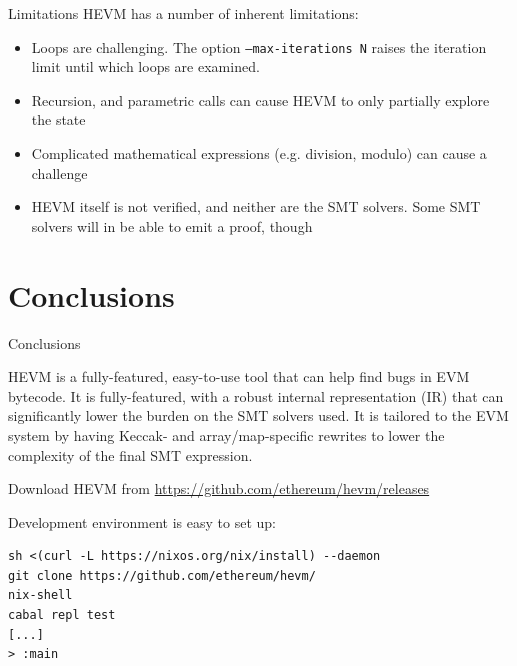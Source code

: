 \documentclass[aspectratio=169]{beamer}
\begin{document}
\begin{frame}[fragile=singleslide]{Limitations}
HEVM has a number of inherent limitations:

\begin{itemize}
\item Loops are challenging. The option \texttt{--max-iterations N} raises the iteration limit until which loops are examined.
\item Recursion, and parametric calls can cause HEVM to only partially explore the state
\item Complicated mathematical expressions (e.g. division, modulo) can cause a challenge
\item HEVM itself is not verified, and neither are the SMT solvers. Some SMT solvers will in be able to emit a proof, though
\end{itemize}
\end{frame}

\section{Conclusions}
\begin{frame}[fragile=singleslide]{Conclusions}

HEVM is a fully-featured, easy-to-use tool that can help find bugs in EVM bytecode. It is fully-featured, with a robust internal representation (IR) that can significantly lower the burden on the SMT solvers used. It is tailored to the EVM system by having Keccak- and array/map-specific rewrites to lower the complexity of the final SMT expression.
\bigskip

Download HEVM from \url{https://github.com/ethereum/hevm/releases}
\bigskip

Development environment is easy to set up:
\begin{Verbatim}[frame=single, framerule=0.2mm, framesep=2mm,fontsize=\footnotesize]
sh <(curl -L https://nixos.org/nix/install) --daemon
git clone https://github.com/ethereum/hevm/
nix-shell
cabal repl test
[...]
> :main
\end{Verbatim}

\end{frame}
\end{document}
